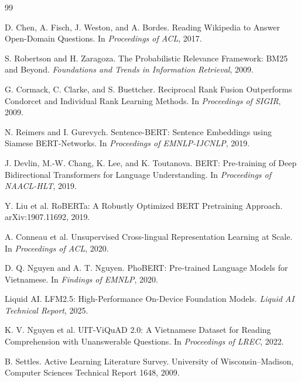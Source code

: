\documentclass[12pt,a4paper,oneside]{report}
\begin{document}
\begin{thebibliography}{99}

D. Chen, A. Fisch, J. Weston, and A. Bordes.
\newblock Reading Wikipedia to Answer Open-Domain Questions.
\newblock In \emph{Proceedings of ACL}, 2017.

S. Robertson and H. Zaragoza.
\newblock The Probabilistic Relevance Framework: BM25 and Beyond.
\newblock \emph{Foundations and Trends in Information Retrieval}, 2009.

G. Cormack, C. Clarke, and S. Buettcher.
\newblock Reciprocal Rank Fusion Outperforms Condorcet and Individual Rank Learning Methods.
\newblock In \emph{Proceedings of SIGIR}, 2009.

N. Reimers and I. Gurevych.
\newblock Sentence-BERT: Sentence Embeddings using Siamese BERT-Networks.
\newblock In \emph{Proceedings of EMNLP-IJCNLP}, 2019.

J. Devlin, M.-W. Chang, K. Lee, and K. Toutanova.
\newblock BERT: Pre-training of Deep Bidirectional Transformers for Language Understanding.
\newblock In \emph{Proceedings of NAACL-HLT}, 2019.

Y. Liu et al.
\newblock RoBERTa: A Robustly Optimized BERT Pretraining Approach.
\newblock arXiv:1907.11692, 2019.

A. Conneau et al.
\newblock Unsupervised Cross-lingual Representation Learning at Scale.
\newblock In \emph{Proceedings of ACL}, 2020.

D. Q. Nguyen and A. T. Nguyen.
\newblock PhoBERT: Pre-trained Language Models for Vietnamese.
\newblock In \emph{Findings of EMNLP}, 2020.

Liquid AI.
\newblock LFM2.5: High-Performance On-Device Foundation Models.
\newblock \emph{Liquid AI Technical Report}, 2025.

K. V. Nguyen et al.
\newblock UIT-ViQuAD 2.0: A Vietnamese Dataset for Reading Comprehension with Unanswerable Questions.
\newblock In \emph{Proceedings of LREC}, 2022.

B. Settles.
\newblock Active Learning Literature Survey.
\newblock University of Wisconsin--Madison, Computer Sciences Technical Report 1648, 2009.

\end{thebibliography}
\end{document}
